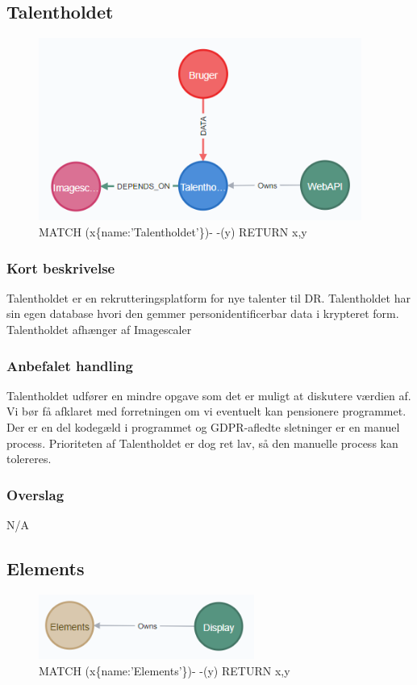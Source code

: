 \documentclass{article}
\begin{document}
\subsection{Talentholdet}
\begin{figure}[h]
\includegraphics[width=300pt]{Talentholdet.PNG}
\caption{MATCH (x\{name:'Talentholdet'\})- -(y) RETURN x,y}
\end{figure}
\subsubsection{Kort beskrivelse}
Talentholdet er en rekrutteringsplatform for nye talenter til DR. Talentholdet har sin egen database hvori den gemmer personidentificerbar data i krypteret form. Talentholdet afhænger af Imagescaler
\subsubsection{Anbefalet handling}
Talentholdet udfører en mindre opgave som det er muligt at diskutere værdien af. Vi bør få afklaret med forretningen om vi eventuelt kan pensionere programmet. Der er en del kodegæld i programmet og GDPR-afledte sletninger er en manuel process.
Prioriteten af Talentholdet er dog ret lav, så den manuelle process kan tolereres.
\subsubsection{Overslag}
N/A

\subsection{Elements}
\begin{figure}[h]
\includegraphics[width=200pt]{Elements.PNG}
\caption{MATCH (x\{name:'Elements'\})- -(y) RETURN x,y}
\end{figure}
\end{document}
